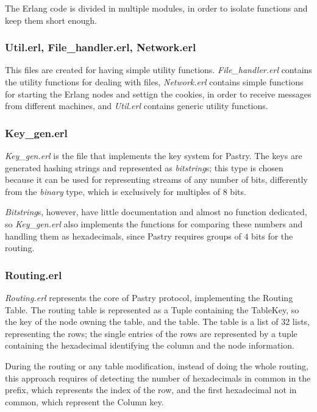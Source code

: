 \documentclass{article}
\begin{document}
The Erlang code is divided in multiple modules, in order to isolate functions and keep them short enough.

\subsubsection{Util.erl, File\_handler.erl, Network.erl}

This files are created for having simple utility functions. \textit{File\_handler.erl} contains the utility functions
for dealing with files, \textit{Network.erl} contains simple functions for starting the Erlang nodes and settign the cookies, in
order to receive messages from different machines, and \textit{Util.erl} contains generic utility functions.

\subsubsection{Key\_gen.erl}

\textit{Key\_gen.erl} is the file that implements the key system for Pastry. The keys are generated hashing strings
and represented as \textit{bitstring}s; this type is chosen because it can be used for
representing streams of any number of bits, differently from the \textit{binary} type, which is exclusively for 
multiples of $8$ bits.

\textit{Bitstring}s, however, have little documentation and almost no function dedicated, so \textit{Key\_gen.erl}
also implements the functions for comparing these numbers and handling them as hexadecimals, since Pastry 
requires groups of $4$ bits for the routing.


\subsubsection{Routing.erl}

\textit{Routing.erl} represents the core of Pastry protocol, implementing the Routing Table.
The routing table is represented as a Tuple containing the TableKey, so the key of the node owning the table,
and the table. The table is a list of 32 lists, representing the rows; the single entries of the rows are 
represented by a tuple containing the hexadecimal identifying the column and the node information.

During the routing or any table modification, instead of doing the whole routing, this approach requires
of detecting the number of hexadecimals in common in the prefix, which represents the index of the row, and the 
first hexadecimal not in common, which represent the Column key.
\end{document}
